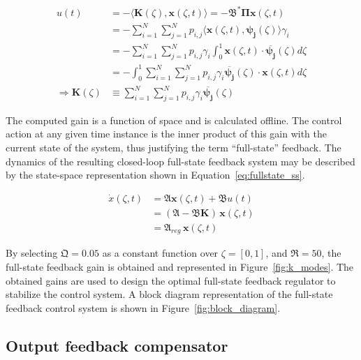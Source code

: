 \begin{equation} \label{eq:fullstate_gain}
    \begin{aligned}
        u(t) &= - \langle \bm{K}(\zeta), \bm{x}(\zeta, t) \rangle = - \mathfrak{B}^* \mathbf{\Pi} \bm{x}(\zeta, t) \\
        &= - \sum_{i=1}^N\sum_{j=1}^N p_{i,j} \langle \bm{x}(\zeta, t), \bm{\psi_j}(\zeta) \rangle \gamma_i \\
        &= - \sum_{i=1}^N\sum_{j=1}^N p_{i,j} \gamma_i \int_0^1 \bm{x}(\zeta, t) \cdot \overline{\bm{\psi_j}}(\zeta) d\zeta \\
        &= - \int_0^1 \sum_{i=1}^N\sum_{j=1}^N p_{i,j} \gamma_i \overline{\bm{\psi_j}}(\zeta) \cdot \bm{x}(\zeta, t) d\zeta \\
        \Rightarrow \bm{K}(\zeta) &\equiv \sum_{i=1}^N\sum_{j=1}^N p_{i,j} \gamma_i \overline{\bm{\psi_j}}(\zeta)
    \end{aligned}
\end{equation}

The computed gain is a function of space and is calculated offline. The control action at any given time instance is the inner product of this gain with the current state of the system, thus justifying the term ``full-state'' feedback. The dynamics of the resulting closed-loop full-state feedback system may be described by the state-space representation shown in Equation~\ref{eq:fullstate_ss}.

\begin{equation}
    \begin{aligned} \label{eq:fullstate_ss}
        \dot{x}(\zeta, t) &= \mathfrak{A} \bm{x}(\zeta, t) + \mathfrak{B} u(t) \\
        &= (\mathfrak{A} - \mathfrak{B} \bm{K}) \, \bm{x}(\zeta, t) \\
        &= \mathfrak{A}_{reg} \, \bm{x}(\zeta, t)
    \end{aligned}
\end{equation}

By selecting $\mathfrak{Q} = 0.05$ as a constant function over $\zeta = [0,1]$, and $\mathfrak{R} = 50$, the full-state feedback gain is obtained and represented in Figure~\ref{fig:k_modes}. The obtained gains are used to design the optimal full-state feedback regulator to stabilize the control system. A block diagram representation of the full-state feedback control system is shown in Figure~\ref{fig:block_diagram}.

\subsection{Output feedback compensator} \label{sec:output_design}

